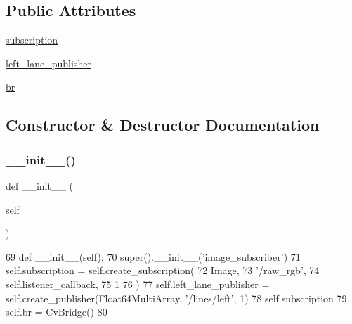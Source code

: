 \subsection*{Public Attributes}
\begin{DoxyCompactItemize}
\item 
\mbox{\hyperlink{classtoxic__vision_1_1lane__detector_1_1ImageSubscriber_a4b0698733c4dfaffe8e2b4cd952b6f82}{subscription}}
\item 
\mbox{\hyperlink{classtoxic__vision_1_1lane__detector_1_1ImageSubscriber_a23e707c10db59b59318fc639544333c0}{left\+\_\+lane\+\_\+publisher}}
\item 
\mbox{\hyperlink{classtoxic__vision_1_1lane__detector_1_1ImageSubscriber_a88f0860257ba6bdc089557444f5cdd16}{br}}
\end{DoxyCompactItemize}


\subsection{Constructor \& Destructor Documentation}
\mbox{\label{classtoxic__vision_1_1lane__detector_1_1ImageSubscriber_ae64f0875afe3067b97ba370b354b9213}} 
\subsubsection{\texorpdfstring{\+\_\+\+\_\+init\+\_\+\+\_\+()}{\_\_init\_\_()}}
{\footnotesize\ttfamily def \+\_\+\+\_\+init\+\_\+\+\_\+ (\begin{DoxyParamCaption}\item[{}]{self }\end{DoxyParamCaption})}


\begin{DoxyCode}
69   \textcolor{keyword}{def }\_\_init\_\_(self):
70     super().\_\_init\_\_(\textcolor{stringliteral}{'image\_subscriber'})
71     self.subscription = self.create\_subscription(
72       Image, 
73       \textcolor{stringliteral}{'/raw\_rgb'}, 
74       self.listener\_callback, 
75       1
76       )
77     self.left\_lane\_publisher = self.create\_publisher(Float64MultiArray, \textcolor{stringliteral}{'/lines/left'}, 1)
78     self.subscription
79     self.br = CvBridge()
80 
\end{DoxyCode}


